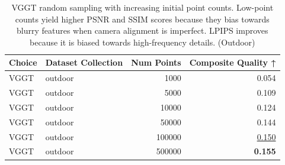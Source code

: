 \begin{table}[H]
\caption{\ifdefined\customcaption \customcaption \else VGGT random sampling with increasing initial point counts. Low-point counts yield higher PSNR and SSIM scores because they bias towards blurry features when camera alignment is imperfect. LPIPS improves because it is biased towards high-frequency details. (Outdoor) \fi}
\label{tab:03_sampling_mode_single_outdoor}
\centering
\scriptsize
\begin{tabular}{llrr}
\toprule
Choice & Dataset Collection & Num Points & Composite Quality ↑ \\
\midrule
VGGT & outdoor & 1000 & 0.054 \\
VGGT & outdoor & 5000 & 0.109 \\
VGGT & outdoor & 10000 & 0.124 \\
VGGT & outdoor & 50000 & 0.144 \\
VGGT & outdoor & 100000 & \underline{0.150} \\
VGGT & outdoor & 500000 & \textbf{0.155} \\
\bottomrule
\end{tabular}
\end{table}
